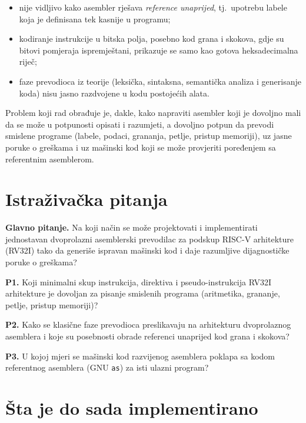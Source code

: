 \documentclass[11pt,a4paper]{article}
\newcommand{\kod}[1]{\texttt{#1}}
\begin{document}
\begin{itemize}
  \item nije vidljivo kako asembler rješava \emph{reference unaprijed}, tj.\ upotrebu labele
        koja je definisana tek kasnije u programu;
  \item kodiranje instrukcije u bitska polja, posebno kod grana i skokova, gdje su bitovi
        pomjeraja ispremještani, prikazuje se samo kao gotova heksadecimalna riječ;
  \item faze prevodioca iz teorije (leksička, sintaksna, semantička analiza i generisanje koda)
        nisu jasno razdvojene u kodu postojećih alata.
\end{itemize}

Problem koji rad obrađuje je, dakle, kako napraviti asembler koji je dovoljno mali da se može
u potpunosti opisati i razumjeti, a dovoljno potpun da prevodi smislene programe (labele, podaci,
grananja, petlje, pristup memoriji), uz jasne poruke o greškama i uz mašinski kod koji se može
provjeriti poređenjem sa referentnim asemblerom.

\section{Istraživačka pitanja}

\textbf{Glavno pitanje.} Na koji način se može projektovati i implementirati jednostavan
dvoprolazni asemblerski prevodilac za podskup RISC-V arhitekture (RV32I) tako da generiše
ispravan mašinski kod i daje razumljive dijagnostičke poruke o greškama?

\textbf{P1.} Koji minimalni skup instrukcija, direktiva i pseudo-instrukcija RV32I arhitekture
je dovoljan za pisanje smislenih programa (aritmetika, grananje, petlje, pristup memoriji)?

\textbf{P2.} Kako se klasične faze prevodioca preslikavaju na arhitekturu dvoprolaznog asemblera
i koje su posebnosti obrade referenci unaprijed kod grana i skokova?

\textbf{P3.} U kojoj mjeri se mašinski kod razvijenog asemblera poklapa sa kodom referentnog
asemblera (GNU \kod{as}) za isti ulazni program?

\section{Šta je do sada implementirano}
\end{document}
